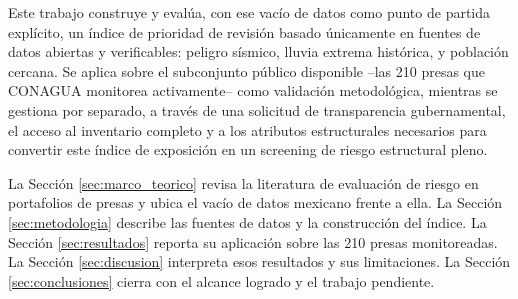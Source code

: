 Este trabajo construye y eval\'ua, con ese vac\'io de datos como punto de partida expl\'icito, un \'indice de prioridad de revisi\'on basado \'unicamente en fuentes de datos abiertas y verificables: peligro s\'ismico, lluvia extrema hist\'orica, y poblaci\'on cercana. Se aplica sobre el subconjunto p\'ublico disponible --las 210 presas que CONAGUA monitorea activamente-- como validaci\'on metodol\'ogica, mientras se gestiona por separado, a trav\'es de una solicitud de transparencia gubernamental, el acceso al inventario completo y a los atributos estructurales necesarios para convertir este \'indice de exposici\'on en un screening de riesgo estructural pleno.

La Secci\'on \ref{sec:marco_teorico} revisa la literatura de evaluaci\'on de riesgo en portafolios de presas y ubica el vac\'io de datos mexicano frente a ella. La Secci\'on \ref{sec:metodologia} describe las fuentes de datos y la construcci\'on del \'indice. La Secci\'on \ref{sec:resultados} reporta su aplicaci\'on sobre las 210 presas monitoreadas. La Secci\'on \ref{sec:discusion} interpreta esos resultados y sus limitaciones. La Secci\'on \ref{sec:conclusiones} cierra con el alcance logrado y el trabajo pendiente.
